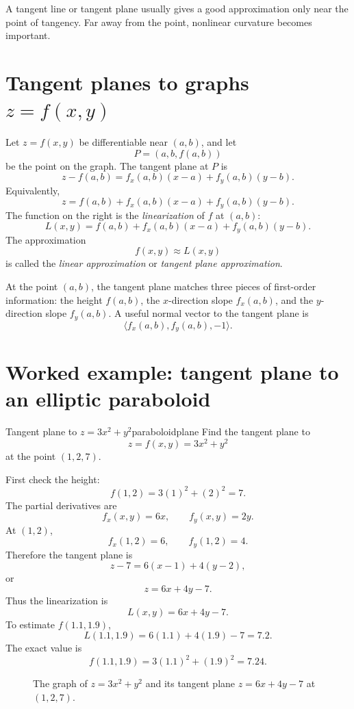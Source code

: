 \documentclass[11pt]{article}
\begin{document}
\begin{tipbox}
A tangent line or tangent plane usually gives a good approximation only near the point of tangency. Far away from the point, nonlinear curvature becomes important.
\end{tipbox}

\section{Tangent planes to graphs $z=f(x,y)$}

Let $z=f(x,y)$ be differentiable near $(a,b)$, and let
\[
P=(a,b,f(a,b))
\]
be the point on the graph. The tangent plane at $P$ is
\[
z-f(a,b)=f_x(a,b)(x-a)+f_y(a,b)(y-b).
\]
Equivalently,
\[
z=f(a,b)+f_x(a,b)(x-a)+f_y(a,b)(y-b).
\]
The function on the right is the \emph{linearization} of $f$ at $(a,b)$:
\[
L(x,y)=f(a,b)+f_x(a,b)(x-a)+f_y(a,b)(y-b).
\]
The approximation
\[
f(x,y)\approx L(x,y)
\]
is called the \emph{linear approximation} or \emph{tangent plane approximation}.

At the point $(a,b)$, the tangent plane matches three pieces of first-order information: the height $f(a,b)$, the $x$-direction slope $f_x(a,b)$, and the $y$-direction slope $f_y(a,b)$. A useful normal vector to the tangent plane is
\[
\langle f_x(a,b),f_y(a,b),-1\rangle.
\]

\section{Worked example: tangent plane to an elliptic paraboloid}

\begin{examplebox}{Tangent plane to $z=3x^2+y^2$}{paraboloidplane}
Find the tangent plane to
\[
z=f(x,y)=3x^2+y^2
\]
at the point $(1,2,7)$.

First check the height:
\[
f(1,2)=3(1)^2+(2)^2=7.
\]
The partial derivatives are
\[
f_x(x,y)=6x,\qquad f_y(x,y)=2y.
\]
At $(1,2)$,
\[
f_x(1,2)=6,\qquad f_y(1,2)=4.
\]
Therefore the tangent plane is
\[
z-7=6(x-1)+4(y-2),
\]
or
\[
z=6x+4y-7.
\]
Thus the linearization is
\[
L(x,y)=6x+4y-7.
\]
To estimate $f(1.1,1.9)$,
\[
L(1.1,1.9)=6(1.1)+4(1.9)-7=7.2.
\]
The exact value is
\[
f(1.1,1.9)=3(1.1)^2+(1.9)^2=7.24.
\]
\end{examplebox}

\begin{figure}[H]
\centering
{}
\caption{The graph of $z=3x^2+y^2$ and its tangent plane $z=6x+4y-7$ at $(1,2,7)$.}
\end{figure}
\end{document}
